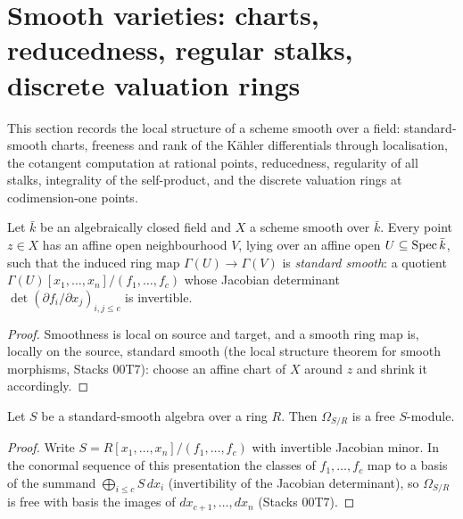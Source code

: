 \section{Smooth varieties: charts, reducedness, regular stalks,
  discrete valuation rings}
\label{pa-sec:smooth_stalks}

This section records the local structure of a scheme smooth over a field:
standard-smooth charts, freeness and rank of the K\"ahler differentials through
localisation, the cotangent computation at rational points, reducedness,
regularity of all stalks, integrality of the self-product, and the discrete
valuation rings at codimension-one points.

\begin{theorem}
  \label{pa-thm:smooth_chart}
  \leanok

  Let \(\bar k\) be an algebraically closed field and \(X\) a scheme smooth
  over \(\bar k\). Every point \(z \in X\) has an affine open neighbourhood
  \(V\), lying over an affine open \(U \subseteq \operatorname{Spec} \bar k\), such that the
  induced ring map \(\Gamma(U) \to \Gamma(V)\) is \emph{standard smooth}: a
  quotient \(\Gamma(U)[x_1, \dots, x_n]/(f_1, \dots, f_c)\) whose Jacobian
  determinant \(\det(\partial f_i/\partial x_j)_{i,j \leq c}\) is invertible.
\end{theorem}
\begin{proof}
  \leanok
  Smoothness is local on source and target, and a smooth ring map is, locally
  on the source, standard smooth (the local structure theorem for smooth
  morphisms, Stacks 00T7): choose an affine chart of \(X\) around \(z\) and
  shrink it accordingly.
\end{proof}

\begin{lemma}
  \label{pa-lem:ss_kaehler_free}
  \leanok

  Let \(S\) be a standard-smooth algebra over a ring \(R\). Then
  \(\Omega_{S/R}\) is a free \(S\)-module.
\end{lemma}
\begin{proof}
  \leanok
  Write \(S = R[x_1, \dots, x_n]/(f_1, \dots, f_c)\) with invertible Jacobian
  minor. In the conormal sequence of this presentation the classes of
  \(f_1, \dots, f_c\) map to a basis of the summand
  \(\bigoplus_{i \leq c} S\,dx_i\) (invertibility of the Jacobian determinant),
  so \(\Omega_{S/R}\) is free with basis the images of
  \(dx_{c+1}, \dots, dx_n\) (Stacks 00T7).
\end{proof}

